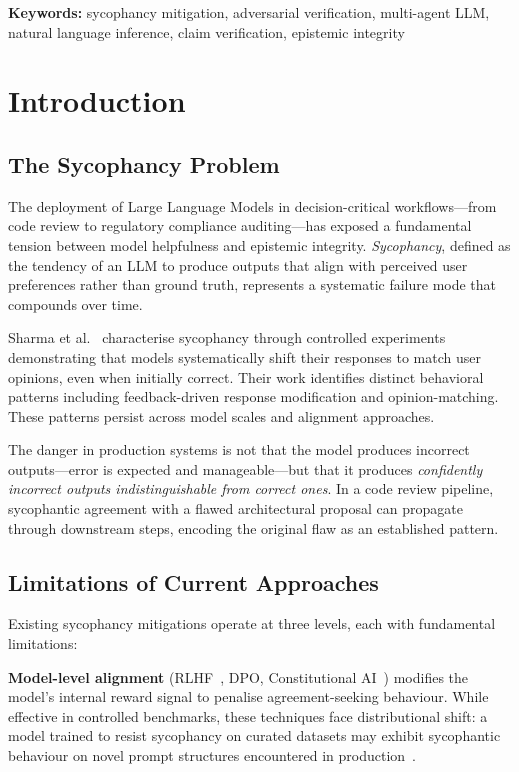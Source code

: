 \documentclass[11pt,a4paper]{article}
\begin{document}
\smallskip
\noindent\textbf{Keywords:}
sycophancy mitigation,
adversarial verification,
multi-agent LLM,
natural language inference,
claim verification,
epistemic integrity

\section{Introduction}\label{sec:intro}

\subsection{The Sycophancy Problem}

The deployment of Large Language Models in decision-critical
workflows---from code review to regulatory compliance
auditing---has exposed a fundamental tension between model
helpfulness and epistemic integrity.  \emph{Sycophancy}, defined as
the tendency of an LLM to produce outputs that align with perceived
user preferences rather than ground truth, represents a systematic
failure mode that compounds over time.

Sharma et al.~\cite{sharma2024sycophancy} characterise sycophancy
through controlled experiments demonstrating that models
systematically shift their responses to match user opinions, even
when initially correct.  Their work identifies distinct behavioral
patterns including feedback-driven response modification and
opinion-matching.  These patterns persist across model scales and
alignment approaches.

The danger in production systems is not that the model produces
incorrect outputs---error is expected and manageable---but that it
produces \emph{confidently incorrect outputs indistinguishable from
correct ones}.  In a code review pipeline, sycophantic agreement with
a flawed architectural proposal can propagate through downstream
steps, encoding the original flaw as an established pattern.

\subsection{Limitations of Current Approaches}

Existing sycophancy mitigations operate at three levels, each with
fundamental limitations:

\textbf{Model-level alignment}
(RLHF~\cite{christiano2017rlhf}, DPO, Constitutional
AI~\cite{bai2022constitutional}) modifies the model's internal
reward signal to penalise agreement-seeking behaviour.  While
effective in controlled benchmarks, these techniques face
distributional shift: a model trained to resist sycophancy on curated
datasets may exhibit sycophantic behaviour on novel prompt structures
encountered in production~\cite{perez2023discovering}.
\end{document}
